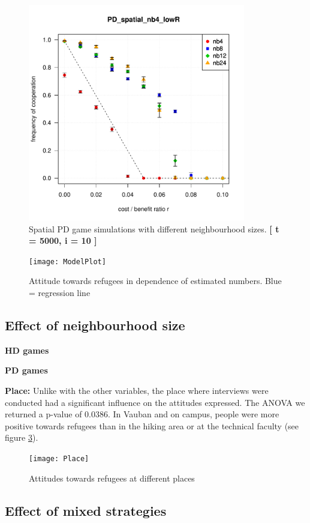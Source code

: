 \begin{figure}
	\centering 
	\includegraphics[width=9.5cm]{task2_multiplot}
	\caption{Spatial PD game simulations with different neighbourhood sizes.  \textbf{[ t = 5000, i = 10 ]} }\label{fig: task2_multiplot}
\end{figure}

\begin{figure}[H]
	\centering 
	\texttt{[image: ModelPlot]}
	\caption{Attitude towards refugees in dependence of estimated numbers. Blue = regression line}\label{fig: ModelPlot}
\end{figure}


\subsection{Effect of neighbourhood size}


\textbf{HD games} 


\textbf{PD games} 

\textbf{Place:} Unlike with the other variables, the place where interviews were conducted had a significant influence on the attitudes expressed. The ANOVA we returned a p-value of 0.0386.
In Vauban and on campus, people were more positive towards refugees than in the hiking area or at the technical faculty (see figure \ref{fig: Place}).

\begin{figure}
	\centering 
	\texttt{[image: Place]}
	\caption{Attitudes towards refugees at different places}\label{fig: Place}
\end{figure}


\subsection{Effect of mixed strategies}

